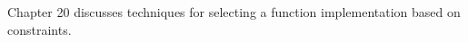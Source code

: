 Chapter 20 discusses techniques for selecting a function implementation based on constraints.






























































